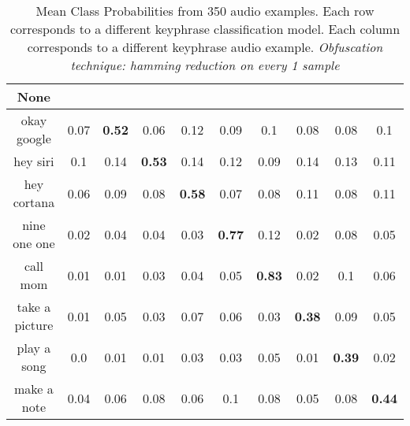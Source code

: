 \begin{table}[!th]
\begin{tabular}{cccccccccc}%
\hline%
None&\rotate{random talk}{70}&\rotate{okay google}{70}&\rotate{hey siri}{70}&\rotate{hey cortana}{70}&\rotate{nine one one}{70}&\rotate{call mom}{70}&\rotate{take a picture}{70}&\rotate{play a song}{70}&\rotate{make a note}{70}\\%
\hline%
okay google&0.07&\textbf{0.52}&0.06&0.12&0.09&0.1&0.08&0.08&0.1\\%
hey siri&0.1&0.14&\textbf{0.53}&0.14&0.12&0.09&0.14&0.13&0.11\\%
hey cortana&0.06&0.09&0.08&\textbf{0.58}&0.07&0.08&0.11&0.08&0.11\\%
nine one one&0.02&0.04&0.04&0.03&\textbf{0.77}&0.12&0.02&0.08&0.05\\%
call mom&0.01&0.01&0.03&0.04&0.05&\textbf{0.83}&0.02&0.1&0.06\\%
take a picture&0.01&0.05&0.03&0.07&0.06&0.03&\textbf{0.38}&0.09&0.05\\%
play a song&0.0&0.01&0.01&0.03&0.03&0.05&0.01&\textbf{0.39}&0.02\\%
make a note&0.04&0.06&0.08&0.06&0.1&0.08&0.05&0.08&\textbf{0.44}\\%
\hline%
\end{tabular}
\caption{Mean Class Probabilities from 350 audio examples. Each row corresponds to a different keyphrase classification model. Each column corresponds to a different keyphrase audio example. \emph{Obfuscation technique: hamming reduction on every 1 sample}}
\label{tab:probs_raw_audio_hamming_1}
\end{table}





